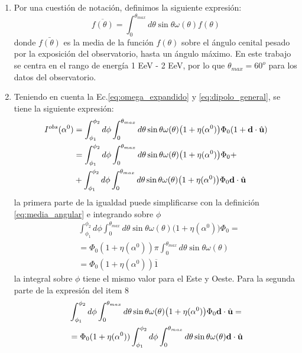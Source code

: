 \begin{enumerate}
    \item Por una cuestión de notación, definimos la siguiente expresión:
    \begin{equation}
        \overline{f(\theta)} = \int_{0}^{\theta_{max}} d\theta \sin\theta \omega(\theta) f(\theta)
        \label{eq:media_angular}
    \end{equation}
    \noindent donde $\bar{f(\theta)}$ es la media de la función $f(\theta)$ sobre el ángulo cenital pesado por la exposición del observatorio, hasta  un ángulo máximo. En este trabajo se centra en el rango de energía 1 EeV - 2 EeV, por lo que $\theta_{max}=60^o$ para los datos del observatorio. 

    \item Teniendo en cuenta la Ec.\ref{eq:omega_expandido} y \ref{eq:dipolo_general}, se tiene la siguiente expresión:
    \begin{align*}
        I^{obs}(\alpha^0) &= \int_{\phi_1}^{\phi_2} d\phi \int_{0}^{\theta_{max}} d\theta  \sin\theta \omega(\theta)\big(1 + \eta(\alpha^0) \big) \Phi_0 ( 1 +  \textbf{d}\cdot\hat{\bf{u}})\\
        &= \int_{\phi_1}^{\phi_2} d\phi \int_{0}^{\theta_{max}} d\theta \sin\theta \omega(\theta)\big(1 + \eta(\alpha^0) \big) \Phi_0 +\\
        &+\int_{\phi_1}^{\phi_2} d\phi \int_{0}^{\theta_{max}} d\theta \sin\theta \omega(\theta)\big(1 + \eta(\alpha^0) \big) \Phi_0 \textbf{d}\cdot\hat{\bf{u}}
    \end{align*}
    \noindent la primera parte  de la igualdad  puede simplificarse con la definición \ref{eq:media_angular} e integrando sobre $\phi$
    \begin{align*}
        &\int_{\phi_1}^{\phi_2} d\phi \int_{0}^{\theta_{max}} d\theta \sin\theta \omega(\theta)\big(1 + \eta(\alpha^0) \big) \Phi_0 =\\
        &= \Phi_0 (1+ \eta(\alpha^0)) \pi \int_{0}^{\theta_{max}}  d\theta \sin\theta \omega(\theta)\\
        &= \Phi_0 (1+ \eta(\alpha^0)) \overline{1} 
    \end{align*}
    \noindent la integral sobre $\phi$ tiene el mismo valor para el Este y Oeste. Para la segunda parte de la expresión del item 8
    \begin{align}
        &\int_{\phi_1}^{\phi_2} d\phi \int_{0}^{\theta_{max}} d\theta \sin\theta \omega(\theta)\big(1 + \eta(\alpha^0) \big) \Phi_0 \textbf{d}\cdot\hat{\bf{u}}=\\
        &=\Phi_0 (1+ \eta(\alpha^0))\int_{\phi_1}^{\phi_2} d\phi \int_{0}^{\theta_{max}}  d\theta \sin\theta \omega(\theta)\textbf{d}\cdot\hat{\bf{u}} \label{segundo_term}

\end{align}
\end{enumerate}
